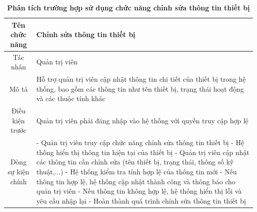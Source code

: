 \begin{table}[H]
	\caption{\bfseries \fontsize{12pt}{0pt}\selectfont Phân tích trường hợp sử dụng chức năng chỉnh sửa thông tin thiết bị}
	\centering
	\begin{tabularx}{0.9\textwidth}{|c|X|}
		\hline
		\textbf{Tên chức năng} & \textbf{Chỉnh sửa thông tin thiết bị}                                                                                                                             \\
		\hline
		Tác nhân               & Quản trị viên                                                                                                                                                     \\
		\hline
		Mô tả                  & Hỗ trợ quản trị viên cập nhật thông tin chi tiết của thiết bị trong hệ thống, bao gồm các thông tin như tên thiết bị, trạng thái hoạt động và các thuộc tính khác \\
		\hline
		Điều kiện trước        & Quản trị viên phải đăng nhập vào hệ thống với quyền truy cập hợp lệ                                                                                               \\
		\hline
		Dòng sự kiện chính     &
		- Quản trị viên truy cập chức năng chỉnh sửa thông tin thiết bị \newline
		- Hệ thống hiển thị thông tin hiện tại của thiết bị \newline
		- Quản trị viên cập nhật các thông tin cần chỉnh sửa (tên thiết bị, trạng thái, thông số kỹ thuật,...) \newline
		- Hệ thống kiểm tra tính hợp lệ của thông tin mới \newline
		- Nếu thông tin hợp lệ, hệ thống cập nhật thành công và thông báo cho quản trị viên \newline
		- Nếu thông tin không hợp lệ, hệ thống hiển thị lỗi và yêu cầu nhập lại \newline
		- Hoàn thành quá trình chỉnh sửa thông tin thiết bị                                                                                                                                        \\
		\hline
	\end{tabularx}
\end{table}

